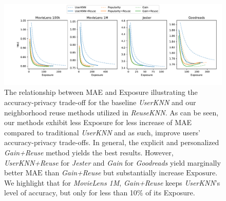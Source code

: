 \documentclass[manuscript,review,anonymous]{acmart}
\begin{document}
\begin{figure}[!t]
    \centering
    \includegraphics[width=\linewidth]{figures/tradeoff.pdf}
    \caption{The relationship between MAE and Exposure illustrating the accuracy-privacy trade-off for the baseline \emph{UserKNN} and our neighborhood reuse methods utilized in \emph{ReuseKNN}. As can be seen, our methods exhibit less Exposure for less increase of MAE compared to traditional \emph{UserKNN} and as such, improve users' accuracy-privacy trade-offs. In general, the explicit and personalized \emph{Gain+Reuse} method yields the best results. However, \emph{UserKNN+Reuse} for \emph{Jester} and \emph{Gain} for \emph{Goodreads} yield marginally better $\mathrm{MAE}$ than \emph{Gain+Reuse} but substantially increase $\mathrm{Exposure}$. We highlight that for \emph{MovieLens 1M}, \emph{Gain+Reuse} keeps \emph{UserKNN}'s level of accuracy, but only for less than 10\% of its Exposure.
    }
    \label{fig:results_trade-off}
\end{figure}
\end{document}
